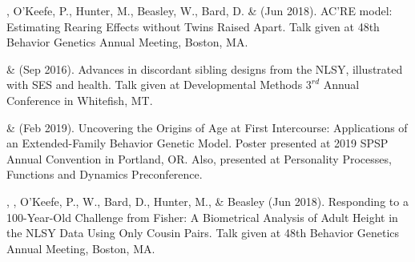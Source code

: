 
\item\meb, O'Keefe, P., Hunter, M., Beasley, W., Bard, D. \& \Joe (Jun 2018). AC'RE model: Estimating Rearing Effects without Twins Raised Apart. Talk given at 48th Behavior Genetics Annual Meeting, Boston, MA. 
\item\meb \& \joe (Sep 2016). Advances in discordant sibling designs from the NLSY, illustrated with SES and health. Talk given at Developmental Methods $3^{rd}$ Annual Conference in Whitefish, MT.\smallskip\\
%
\item \meb \& \Joe (Feb 2019). Uncovering the Origins of Age at First Intercourse: Applications of an Extended-Family Behavior Genetic Model. Poster presented at 2019 SPSP Annual Convention in Portland, OR. Also, presented at Personality Processes, Functions and Dynamics Preconference.

\item\Joe, \meb, O'Keefe, P., W., Bard, D., Hunter, M., \& Beasley (Jun 2018). Responding to a 100-Year-Old Challenge from Fisher: A Biometrical Analysis of Adult Height in the NLSY Data Using Only Cousin Pairs. Talk given at 48th Behavior Genetics Annual Meeting, Boston, MA. 

